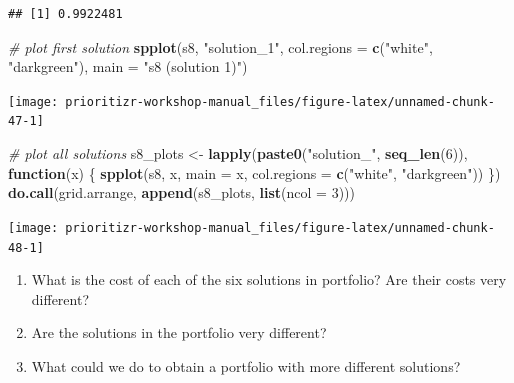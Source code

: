 \documentclass[12pt,]{book}
\makeatletter
\newenvironment{Shaded}{\begin{snugshade}}{\end{snugshade}}
\newcommand{\CommentTok}[1]{\textcolor[rgb]{0.56,0.35,0.01}{\textit{#1}}}
\newcommand{\ControlFlowTok}[1]{\textcolor[rgb]{0.13,0.29,0.53}{\textbf{#1}}}
\newcommand{\DataTypeTok}[1]{\textcolor[rgb]{0.13,0.29,0.53}{#1}}
\newcommand{\DecValTok}[1]{\textcolor[rgb]{0.00,0.00,0.81}{#1}}
\newcommand{\KeywordTok}[1]{\textcolor[rgb]{0.13,0.29,0.53}{\textbf{#1}}}
\newcommand{\NormalTok}[1]{#1}
\newcommand{\StringTok}[1]{\textcolor[rgb]{0.31,0.60,0.02}{#1}}
\providecommand{\tightlist}{%
  \setlength{\itemsep}{0pt}\setlength{\parskip}{0pt}}
\newenvironment{kframe}{%
\medskip{}
\setlength{\fboxsep}{.8em}
 \def\at@end@of@kframe{}%
 \ifinner\ifhmode%
  \def\at@end@of@kframe{\end{minipage}}%
  \begin{minipage}{\columnwidth}%
 \fi\fi%
 \def\FrameCommand##1{\hskip\@totalleftmargin \hskip-\fboxsep
 \colorbox{shadecolor}{##1}\hskip-\fboxsep
     \hskip-\linewidth \hskip-\@totalleftmargin \hskip\columnwidth}%
 \MakeFramed {\advance\hsize-\width
   \@totalleftmargin\z@ \linewidth\hsize
   \@setminipage}}%
 {\par\unskip\endMakeFramed%
 \at@end@of@kframe}
\newenvironment{rmdblock}[1]
  {
  \begin{itemize}
  \renewcommand{\labelitemi}{
    \raisebox{-.7\height}[0pt][0pt]{
      {\setkeys{Gin}{width=3em,keepaspectratio}\texttt{[image: images/\#1]}}
    }
  }
  \setlength{\fboxsep}{1em}
  \begin{kframe}
  \item
  }
  {
  \end{kframe}
  \end{itemize}
  }
\newenvironment{rmdquestion}
  {\begin{rmdblock}{question}}
  {\end{rmdblock}}
\makeatother
\begin{document}
\begin{verbatim}
## [1] 0.9922481
\end{verbatim}

\begin{Shaded}
\begin{Highlighting}[]
\CommentTok{# plot first solution}
\KeywordTok{spplot}\NormalTok{(s8, }\StringTok{"solution_1"}\NormalTok{, }\DataTypeTok{col.regions =} \KeywordTok{c}\NormalTok{(}\StringTok{"white"}\NormalTok{, }\StringTok{"darkgreen"}\NormalTok{),}
       \DataTypeTok{main =} \StringTok{"s8 (solution 1)"}\NormalTok{)}
\end{Highlighting}
\end{Shaded}

\begin{center}\texttt{[image: prioritizr-workshop-manual\_files/figure-latex/unnamed-chunk-47-1]} \end{center}

\clearpage

\begin{Shaded}
\begin{Highlighting}[]
\CommentTok{# plot all solutions}
\NormalTok{s8_plots <-}\StringTok{ }\KeywordTok{lapply}\NormalTok{(}\KeywordTok{paste0}\NormalTok{(}\StringTok{"solution_"}\NormalTok{, }\KeywordTok{seq_len}\NormalTok{(}\DecValTok{6}\NormalTok{)), }\ControlFlowTok{function}\NormalTok{(x) \{}
  \KeywordTok{spplot}\NormalTok{(s8, x, }\DataTypeTok{main =}\NormalTok{ x, }\DataTypeTok{col.regions =} \KeywordTok{c}\NormalTok{(}\StringTok{"white"}\NormalTok{, }\StringTok{"darkgreen"}\NormalTok{))}
\NormalTok{\})}
\KeywordTok{do.call}\NormalTok{(grid.arrange, }\KeywordTok{append}\NormalTok{(s8_plots, }\KeywordTok{list}\NormalTok{(}\DataTypeTok{ncol =} \DecValTok{3}\NormalTok{)))}
\end{Highlighting}
\end{Shaded}

\begin{center}\texttt{[image: prioritizr-workshop-manual\_files/figure-latex/unnamed-chunk-48-1]} \end{center}

\begin{rmdquestion}
\begin{enumerate}
\def\labelenumi{\arabic{enumi}.}
\tightlist
\item
  What is the cost of each of the six solutions in portfolio? Are their costs very different?
\item
  Are the solutions in the portfolio very different?
\item
  What could we do to obtain a portfolio with more different solutions?
\end{enumerate}
\end{rmdquestion}
\end{document}
